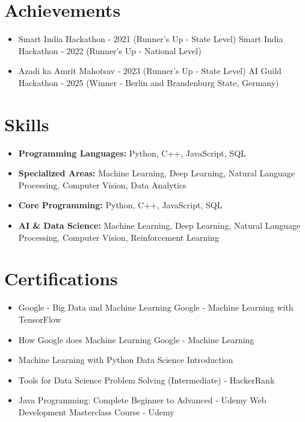 \documentclass[a4paper,10pt]{article}
\begin{document}
\section*{Achievements}
\begin{itemize}
\item Smart India Hackathon - 2021 (Runner's Up - State Level) \hfill Smart India Hackathon - 2022 (Runner's Up - National Level)
\item Azadi ka Amrit Mahotsav - 2023 (Runner's Up - State Level) \hfill AI Guild Hackathon - 2025 (Winner - Berlin and Brandenburg State, Germany)
\end{itemize}

\section*{Skills}
\begin{itemize}
  \item \textbf{Programming Languages:} Python, C++, JavaScript, SQL
  \item \textbf{Specialized Areas:} Machine Learning, Deep Learning, Natural Language Processing, Computer Vision, Data Analytics
  \item \textbf{Core Programming:} Python, C++, JavaScript, SQL
  \item \textbf{AI \& Data Science:} Machine Learning, Deep Learning, Natural Language Processing, Computer Vision, Reinforcement Learning
\end{itemize}

\section*{Certifications}
\begin{itemize}
\item Google - Big Data and Machine Learning \hfill Google - Machine Learning with TensorFlow
\item How Google does Machine Learning \hfill Google - Machine Learning
\item Machine Learning with Python \hfill Data Science Introduction
\item Tools for Data Science \hfill Problem Solving (Intermediate) - HackerRank
\item Java Programming: Complete Beginner to Advanced - Udemy \hfill Web Development Masterclass Course - Udemy
\end{itemize}
\end{document}
